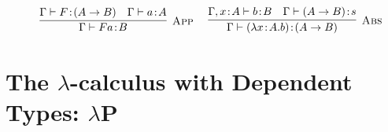 \documentclass[reqno]{amsart}
\begin{document}
\begin{definition}
\begin{enumerate}
{\begin{equation*}
\begin{gathered}
{                        }\ \ \ \ 
                        \infer[\mathsc{App}]{\Gamma\proves Fa\!:\!B}{
                            \Gamma\proves F\!:\!(A\rightarrow B) &
                            \Gamma\proves a\!:\!A
                        }\ \ \ \ 
                        \infer[\mathsc{Abs}]{\Gamma\proves(\lambda x\!:\!A.b)\!:\!(A\rightarrow B)}{
                            \Gamma,x\!:\!A\proves b\!:\!B &
                            \Gamma\proves(A\rightarrow B)\!:\!s
                        }
                    \end{gathered}
                \end{equation*}}
        \end{enumerate}
    \end{definition}

    \begin{theorem}

    \end{theorem}

    \section{The $\lambda$-calculus with Dependent Types: $\lambda\mathbf{P}$}
\end{document}
